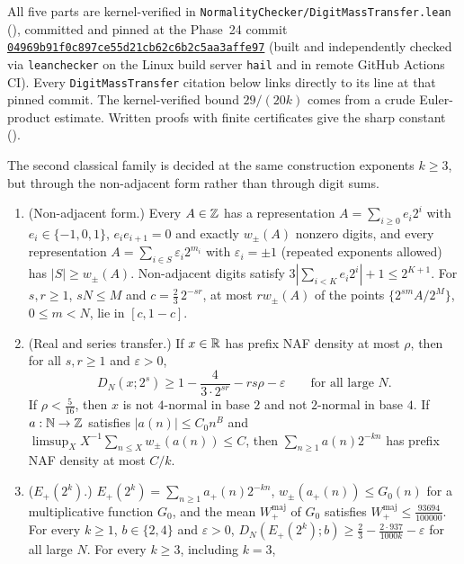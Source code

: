 \documentclass[11pt]{article}
\newcommand{\ttbreak}{\discretionary{}{}{}}
\newcommand{\ttt}[1]{\texttt{\begingroup\def\_{\textunderscore\ttbreak}#1\endgroup}}
\newcommand{\tpath}[1]{\nolinkurl{#1}}
\newcommand{\wpm}{w_{\pm}}
\newcommand{\phaseXXIVcommit}{04969b91f0c897ce55d21cb62c6b2c5aa3affe97}
\newcommand{\commitref}[1]{\href{https://github.com/eldernos/MathematicsResearch/commit/#1}{\expandafter\nolinkurl\expandafter{#1}}}
\begin{document}
All five parts are kernel-verified in \tpath{NormalityChecker/DigitMassTransfer.lean} (), committed and pinned at the Phase~24 commit \commitref{\phaseXXIVcommit} (built and independently checked via \ttt{leanchecker} on the Linux build server \ttt{hail} and in remote GitHub Actions CI). Every \ttt{DigitMassTransfer} citation below links directly to its line at that pinned commit. The kernel-verified bound $29/(20k)$ comes from a crude Euler-product estimate. Written proofs with finite certificates give the sharp constant ().

The second classical family is decided at the same construction exponents $k\ge3$, but through the non-adjacent form rather than through digit sums.

\begin{maintheorem}\label{thm:Eplus-main}
\begin{enumerate}[label=\textup{(\roman*)},nosep]
\item {} \textup{(Non-adjacent form.)} Every $A\in\mathbb Z$ has a representation $A=\sum_{i\ge0}e_i2^i$ with $e_i\in\{-1,0,1\}$, $e_ie_{i+1}=0$ and exactly $\wpm(A)$ nonzero digits, and every representation $A=\sum_{i\in S}\varepsilon_i2^{m_i}$ with $\varepsilon_i=\pm1$ (repeated exponents allowed) has $|S|\ge\wpm(A)$. Non-adjacent digits satisfy $3|\sum_{i<K}e_i2^i|+1\le2^{K+1}$. For $s,r\ge1$, $sN\le M$ and $c=\frac23\,2^{-sr}$, at most $r\wpm(A)$ of the points $\{2^{sm}A/2^M\}$, $0\le m<N$, lie in $[c,1-c]$.
\item {} \textup{(Real and series transfer.)} If $x\in\mathbb R$ has prefix NAF density at most $\rho$, then for all $s,r\ge1$ and $\varepsilon>0$,
\[
D_N(x;2^s)\ge1-\frac4{3\cdot2^{sr}}-rs\rho-\varepsilon\qquad\text{for all large }N.
\]
If $\rho<\frac5{16}$, then $x$ is not $4$-normal in base $2$ and not $2$-normal in base $4$. If $a:\mathbb N\to\mathbb Z$ satisfies $|a(n)|\le C_0n^B$ and $\limsup_XX^{-1}\sum_{n\le X}\wpm(a(n))\le C$, then $\sum_{n\ge1}a(n)2^{-kn}$ has prefix NAF density at most $C/k$.
\item {} \textup{($E_+(2^k)$.)} $E_+(2^k)=\sum_{n\ge1}a_+(n)2^{-kn}$, $\wpm(a_+(n))\le G_0(n)$ for a multiplicative function $G_0$, and the mean $W_+^{\mathrm{maj}}$ of $G_0$ satisfies $W_+^{\mathrm{maj}}\le\frac{93694}{100000}$. For every $k\ge1$, $b\in\{2,4\}$ and $\varepsilon>0$, $D_N(E_+(2^k);b)\ge\frac23-\frac{2\cdot937}{1000k}-\varepsilon$ for all large $N$. For every $k\ge3$, including $k=3$,

\end{enumerate}
\end{maintheorem}
\end{document}
